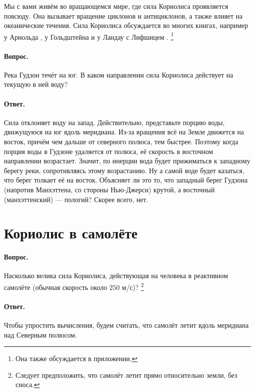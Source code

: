 Мы с вами живём во вращающемся мире, где сила Кориолиса проявляется повсюду.
Она вызывает вращение циклонов и антициклонов, а также влияет на океанические течения.
Сила Кориолиса обсуждается во многих книгах, например у \label{Арнольд-Лифшиц} Арнольда \cite{arnold1980}, у Гольдштейна \cite{goldstein1950} и у Ландау с Лифшицем \cite{landau2002}.%
\footnote{Она также обсуждается в приложении. \pr}

\paragraph{Вопрос.}\label{Гудзон}
Река Гудзон течёт на юг.
В каком направлении сила Кориолиса действует на текущую в ней воду?

\paragraph{Ответ.}
Сила отклоняет воду на запад.
Действительно, представьте порцию воды, движущуюся на юг вдоль меридиана.
Из-за вращения всё на Земле движется на восток, причём чем дальше от северного полюса, тем быстрее.
Поэтому когда порция воды в Гудзоне удаляется от полюса, её скорость в восточном направлении возрастает.
Значит, по инерции вода будет прижиматься к западному берегу реки,
сопротивляясь этому возрастанию.
Ну а самой воде будет казаться, что берег толкает её на восток.
Объясняет ли это то, что западный берег Гудзона (напротив Манхэттена, со стороны Нью-Джерси) крутой, а восточный (манхэттенский) --- пологий?
Скорее всего, нет.

\section{Кориолис в самолёте}\label{Кориолис в самолёте}

\paragraph{Вопрос.}
Насколько велика сила Кориолиса, действующая на человека в реактивном самолёте (обычная скорость около $250$ м/с)?%
\footnote{Следует предположить, что самолёт летит прямо относительно земли, без сноса. \pr}

\paragraph{Ответ.}
Чтобы упростить вычисления, будем считать, что самолёт летит вдоль меридиана над Северным полюсом.

